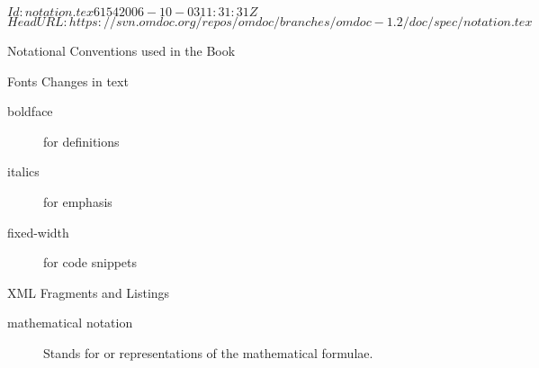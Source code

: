 \svnInfo $Id: notation.tex 6154 2006-10-03 11:31:31Z  $
\svnKeyword $HeadURL: https://svn.omdoc.org/repos/omdoc/branches/omdoc-1.2/doc/spec/notation.tex $

\begin{tchapter}[id=notation]{Notational Conventions used in the Book}

\begin{tsection}[id=notation:fonts]{Fonts Changes in text}
  \begin{description}
  \item[boldface] for definitions
  \item[italics] for emphasis
  \item[fixed-width] for code snippets
  \end{description}
\end{tsection}

\begin{tsection}[id=notation:xml]{XML Fragments and Listings}
  \begin{description}
  \item[mathematical notation] Stands for {\openmath} or {\cmathml} representations of the
    mathematical formulae.
  \end{description}
\end{tsection}
\end{tchapter}
